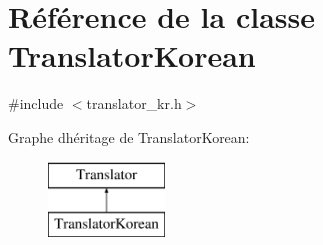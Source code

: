 \hypertarget{class_translator_korean}{}\section{Référence de la classe Translator\+Korean}
\label{class_translator_korean}


{\ttfamily \#include $<$translator\+\_\+kr.\+h$>$}

Graphe d\textquotesingle{}héritage de Translator\+Korean\+:\begin{figure}[H]
\begin{center}
\leavevmode
\includegraphics[height=2.000000cm]{class_translator_korean}
\end{center}
\end{figure}
